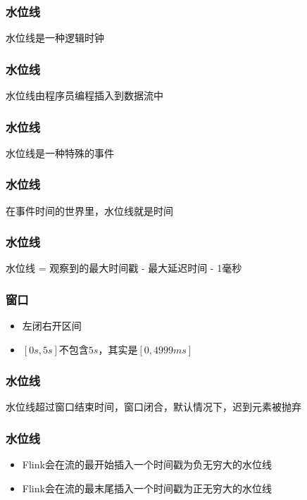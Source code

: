 \documentclass{beamer}
\begin{document}
\begin{frame}
	\frametitle{水位线}
	\begin{tcolorbox}
		水位线是一种逻辑时钟
	\end{tcolorbox}
\end{frame}

\begin{frame}
	\frametitle{水位线}
	\begin{tcolorbox}
		水位线由程序员编程插入到数据流中
	\end{tcolorbox}
\end{frame}

\begin{frame}
	\frametitle{水位线}
	\begin{tcolorbox}
		水位线是一种特殊的事件
	\end{tcolorbox}
\end{frame}

\begin{frame}
	\frametitle{水位线}
	\begin{tcolorbox}
		在事件时间的世界里，水位线就是时间
	\end{tcolorbox}
\end{frame}

\begin{frame}
	\frametitle{水位线}
	\begin{tcolorbox}
		水位线 = 观察到的最大时间戳 - 最大延迟时间 - 1毫秒
	\end{tcolorbox}
\end{frame}

\begin{frame}
	\frametitle{窗口}
	\begin{tcolorbox}
		\begin{itemize}
			\item 左闭右开区间
			\item $\left[ 0s,5s \right] \text{不包含}  5s \text{，其实是} \left[ 0,4999ms \right]$
		\end{itemize}
	\end{tcolorbox}
	
\end{frame}

\begin{frame}
	\frametitle{水位线}
	\begin{tcolorbox}
		水位线超过窗口结束时间，窗口闭合，默认情况下，迟到元素被抛弃
	\end{tcolorbox}
\end{frame}

\begin{frame}
	\frametitle{水位线}
	\begin{tcolorbox}
		\begin{itemize}
			\item Flink会在流的最开始插入一个时间戳为负无穷大的水位线
			\item Flink会在流的最末尾插入一个时间戳为正无穷大的水位线
		\end{itemize}
	\end{tcolorbox}
\end{frame}
\end{document}
